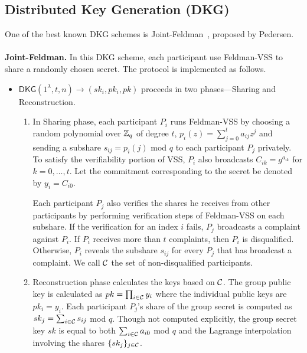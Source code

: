 \subsection{Distributed Key Generation (DKG)}
\label{appendix:dkg}
One of the best known DKG schemes is Joint-Feldman~\cite{pedersen1991threshold}, proposed by Pedersen.\\\\
\noindent\textbf{Joint-Feldman.}
\label{appendix:jointFeldman}
 In this DKG scheme, each participant use Feldman-VSS to share a randomly chosen secret. The protocol is implemented as follows.
\begin{itemize}
    \item $\mathsf{DKG}(1^\lambda, t, n) \rightarrow (sk_i, pk_i, pk)$ proceeds in two phases---Sharing and Reconstruction.
    \begin{enumerate}
        \item In Sharing phase, each participant $P_i$ runs Feldman-VSS by choosing a random polynomial over $\mathbb{Z}_q$ of degree $t$, $p_i(z) = \sum_{j = 0}^{t} a_{ij} z^j$ and sending a subshare $s_{ij} = p_i(j)$ mod $q$ to each participant $P_j$ privately. \\
        To satisfy the verifiability portion of VSS, $P_i$ also broadcasts $C_{ik} = g^{a_{ik}}$ for $k = 0, \ldots, t$. Let the commitment corresponding to the secret be denoted by $y_i = C_{i0}$.

        Each participant $P_j$ also verifies the shares he receives from other participants by performing verification steps of Feldman-VSS on each subshare. If the verification for an index $i$ fails, $P_j$ broadcasts a complaint against $P_i$. If $P_i$ receives more than $t$ complaints, then $P_i$ is disqualified. Otherwise, $P_i$ reveals the subshare $s_{ij}$ for every $P_j$ that has broadcast a complaint. We call $\mathcal{C}$ the set of non-disqualified participants.

        \item Reconstruction phase calculates the keys based on $\mathcal{C}$.
        The group public key is calculated as $pk = \prod_{i \in \mathcal{C}} y_i$ where the individual public keys are $pk_i = y_i$. Each participant $P_j$'s share of the group secret is computed as $sk_j = \sum_{i \in \mathcal{C}} s_{ij}$ mod $q$. Though not computed explicitly, the group secret key $sk$ is equal to both $\sum_{i \in \mathcal{C}} a_{i0}$ mod $q$ and the Lagrange interpolation involving the shares $\{sk_j\}_{j \in \mathcal{C}}$.
    \end{enumerate}
\end{itemize}

